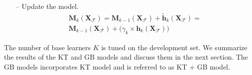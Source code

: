 \documentclass{article}
\begin{document}
\begin{itemize}
\item[--] Update the model. 
\begin{equation}
\begin{aligned}
\bm M_k(\bm X_\mathcal F) = \bm M_{k-1} (\bm X_\mathcal F) + \tilde{\bm h}_k(\bm X_\mathcal F) = \\
\bm M_{k-1} (\bm X_\mathcal F) + \big(\gamma_k \times \bm h_k(\bm X_\mathcal F)\big)
\end{aligned}
\end{equation}

\end{itemize}

The number of base learners $K$ is tuned on the development set.
We summarize the results of the KT and GB models and discuss them in the next section.
The GB models incorporates KT model and is referred to as KT + GB model.

%
\end{document}
